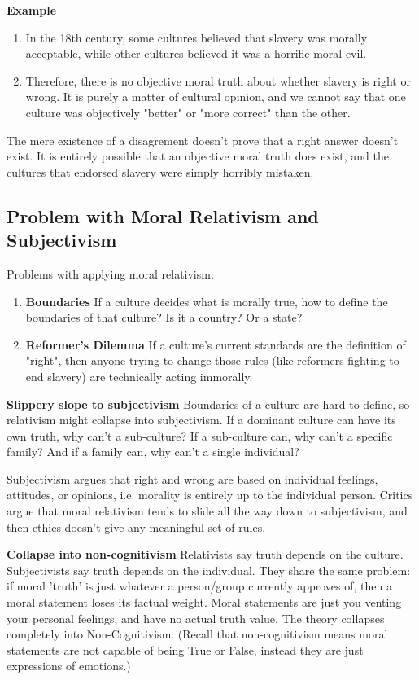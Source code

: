 \documentclass[12pt]{article}
\begin{document}
\noindent\textbf{Example}
\begin{enumerate}
    \item In the 18th century, some cultures believed that slavery was morally acceptable, while other cultures believed it was a horrific moral evil.
    \item Therefore, there is no objective moral truth about whether slavery is right or wrong. 
    It is purely a matter of cultural opinion, and we cannot say that one culture was objectively "better" or "more correct" than the other.
\end{enumerate}
The mere existence of a disagrement doesn't prove that a right answer doesn't exist. It is entirely possible that 
an objective moral truth does exist, and the cultures that endorsed slavery were simply horribly mistaken.

\subsection{Problem with Moral Relativism and Subjectivism}
Problems with applying moral relativism:
\begin{enumerate}
    \item \textbf{Boundaries} If a culture decides what is morally true, how to define the boundaries of that culture?
    Is it a country? Or a state?
    \item \textbf{Reformer's Dilemma} If a culture's current standards are the definition of "right",
    then anyone trying to change those rules (like reformers fighting to end slavery) are technically acting immorally.
\end{enumerate}
\textbf{Slippery slope to subjectivism} Boundaries of a culture are hard to define, so relativism might collapse into subjectivism.
If a dominant culture can have its own truth, why can't a sub-culture? If a sub-culture can, why can't a specific family? And if a family can, why can't a single individual?

\noindent Subjectivism argues that right and wrong are based on individual feelings, attitudes, or opinions,
i.e. morality is entirely up to the individual person.
Critics argue that moral relativism tends to slide all the way down to subjectivism, and then ethics doesn't give any meaningful set of rules.

\noindent\textbf{Collapse into non-cognitivism}
Relativists say truth depends on the culture. Subjectivists say truth depends on the individual.
They share the same problem: if moral 'truth' is just whatever a person/group currently approves of, then a moral statement loses its factual weight.
Moral statements are just you venting your personal feelings, and have no actual truth value.
The theory collapses completely into Non-Cognitivism.
(Recall that non-cognitivism means moral statements are not capable of being True or False,
instead they are just expressions of emotions.)
\end{document}
